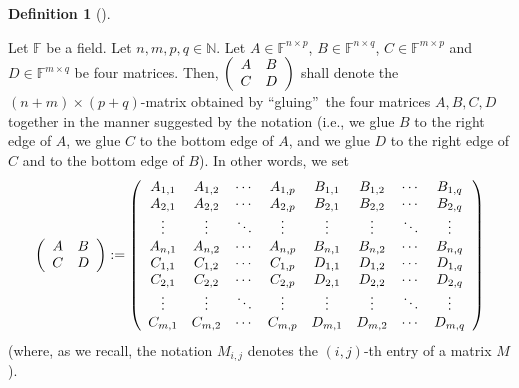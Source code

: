 \documentclass[numbers=enddot,12pt,final,onecolumn,notitlepage]{scrartcl}%
\numberwithin{exer}{subsection}
\theoremstyle{definition}
\newtheorem{defi}[theo]{Definition}
\newenvironment{definition}[1][]
{\begin{defi}[#1]\begin{leftbar}}
{\end{leftbar}\end{defi}}
\begin{document}
\begin{definition}
\label{def.blockmats.2x2}Let $\mathbb{F}$ be a field. Let $n,m,p,q\in
\mathbb{N}$. Let $A\in\mathbb{F}^{n\times p}$, $B\in\mathbb{F}^{n\times q}$,
$C\in\mathbb{F}^{m\times p}$ and $D\in\mathbb{F}^{m\times q}$ be four
matrices. Then, $\left(
\begin{array}
[c]{cc}%
A & B\\
C & D
\end{array}
\right)  $ shall denote the $\left(  n+m\right)  \times\left(  p+q\right)
$-matrix obtained by \textquotedblleft gluing\textquotedblright\ the four
matrices $A,B,C,D$ together in the manner suggested by the notation (i.e., we
glue $B$ to the right edge of $A$, we glue $C$ to the bottom edge of $A$, and
we glue $D$ to the right edge of $C$ and to the bottom edge of $B$). In other
words, we set%
\[
\left(
\begin{array}
[c]{cc}%
A & B\\
C & D
\end{array}
\right)  :=\left(
\begin{array}
[c]{cccccccc}%
A_{1,1} & A_{1,2} & \cdots & A_{1,p} & B_{1,1} & B_{1,2} & \cdots & B_{1,q}\\
A_{2,1} & A_{2,2} & \cdots & A_{2,p} & B_{2,1} & B_{2,2} & \cdots & B_{2,q}\\
\vdots & \vdots & \ddots & \vdots & \vdots & \vdots & \ddots & \vdots\\
A_{n,1} & A_{n,2} & \cdots & A_{n,p} & B_{n,1} & B_{n,2} & \cdots & B_{n,q}\\
C_{1,1} & C_{1,2} & \cdots & C_{1,p} & D_{1,1} & D_{1,2} & \cdots & D_{1,q}\\
C_{2,1} & C_{2,2} & \cdots & C_{2,p} & D_{2,1} & D_{2,2} & \cdots & D_{2,q}\\
\vdots & \vdots & \ddots & \vdots & \vdots & \vdots & \ddots & \vdots\\
C_{m,1} & C_{m,2} & \cdots & C_{m,p} & D_{m,1} & D_{m,2} & \cdots & D_{m,q}%
\end{array}
\right)
\]
(where, as we recall, the notation $M_{i,j}$ denotes the $\left(  i,j\right)
$-th entry of a matrix $M$).
\end{definition}
\end{document}
